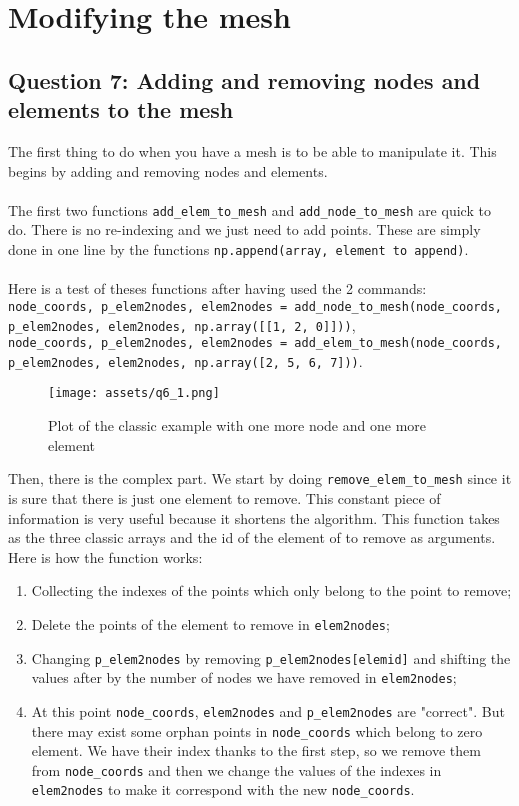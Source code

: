 \documentclass[a4paper]{article}
\begin{document}
\section{Modifying the mesh}

\subsection{Question 7: Adding and removing nodes and elements to the mesh}

The first thing to do when you have a mesh is to be able to manipulate it. This begins by adding and removing nodes and elements.\\ \\
The first two functions \texttt{add\_elem\_to\_mesh} and \texttt{add\_node\_to\_mesh} are quick to do. There is no re-indexing and we just need to add points. These are simply done in one line by the functions \texttt{np.append(array, element to append)}.\\ \\
Here is a test of theses functions after having used the 2 commands:\\
\texttt{node\_coords, p\_elem2nodes, elem2nodes = add\_node\_to\_mesh(node\_coords, p\_elem2nodes, elem2nodes, np.array([[1, 2, 0]]))},\\
\texttt{node\_coords, p\_elem2nodes, elem2nodes = add\_elem\_to\_mesh(node\_coords, p\_elem2nodes, elem2nodes, np.array([2, 5, 6, 7]))}.
\begin{figure}[H]
    \centering
    \texttt{[image: assets/q6\_1.png]}
    \caption{Plot of the classic example with one more node and one more element}
    \label{fig:plot_classic_example}
\end{figure}
\noindent Then, there is the complex part. We start by doing \texttt{remove\_elem\_to\_mesh} since it is sure that there is just one element to remove. This constant piece of information is very useful because it shortens the algorithm. This function takes as the three classic arrays and the id of the element of to remove as arguments.\\
Here is how the function works:
\begin{enumerate}
    \item Collecting the indexes of the points which only belong to the point to remove;
    \item Delete the points of the element to remove in \texttt{elem2nodes};
    \item Changing \texttt{p\_elem2nodes} by removing \texttt{p\_elem2nodes[elemid]} and shifting the values after by the number of nodes we have removed in \texttt{elem2nodes};
    \item At this point \texttt{node\_coords}, \texttt{elem2nodes} and \texttt{p\_elem2nodes} are "correct". But there may exist some orphan points in \texttt{node\_coords} which belong to zero element. We have their index thanks to the first step, so we remove them from \texttt{node\_coords} and then we change the values of the indexes in \texttt{elem2nodes} to make it correspond with the new \texttt{node\_coords}.
\end{enumerate}
\end{document}
